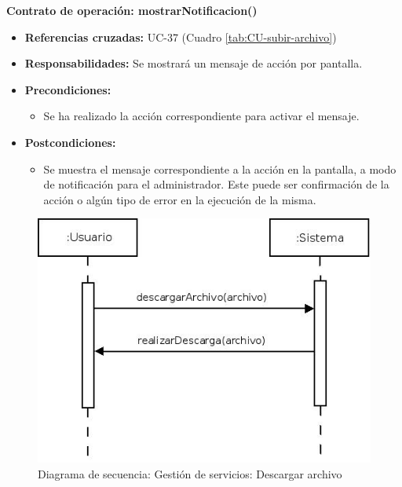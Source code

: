 \textbf{Contrato de operación: mostrarNotificacion()}
\begin{itemize}
\item \textbf{Referencias cruzadas:} UC-37 (Cuadro \ref{tab:CU-subir-archivo})
\item \textbf{Responsabilidades:} Se mostrará un mensaje de acción por pantalla.
\item \textbf{Precondiciones:} 
 \begin{itemize}
\item Se ha realizado la acción correspondiente para activar el mensaje.
\end {itemize}
\item \textbf{Postcondiciones:} 
 \begin{itemize}
\item Se muestra el mensaje correspondiente a la acción en la pantalla, a modo de notificación para el administrador. Este puede ser confirmación de la acción o algún tipo de error en la ejecución de la misma.
\end {itemize}
\end {itemize}


\vspace{7mm}
\dotfill
\vspace{7mm}

\begin{figure}[h!]
\centering
  \includegraphics[scale=.55]{img/secuencias/gestion-servicios-descargar-archivo.jpeg}
  \caption{Diagrama de secuencia: Gestión de servicios: Descargar archivo}
  \label{fig:secuencia-gestion-servicios-descargar-archivo}
\end{figure}


